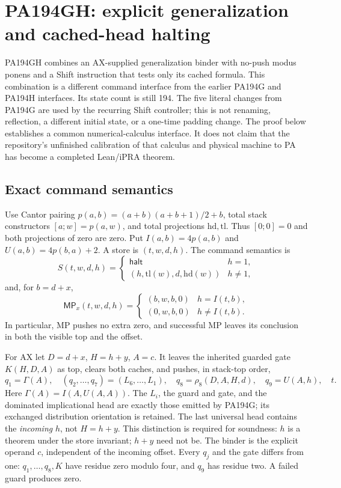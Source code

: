 \section{PA194GH: explicit generalization and cached-head halting}
\label{sec:gh}

PA194GH combines an AX-supplied generalization binder with no-push modus
ponens and a Shift instruction that tests only its cached formula.
This combination is a different command interface from the earlier PA194G
and PA194H interfaces. Its state count is still 194. The five literal
changes from PA194G are used by the recurring Shift controller; this is not
renaming, reflection, a different initial state, or a one-time padding change.
The proof below establishes a common numerical-calculus interface. It does
not claim that the repository's unfinished calibration of that calculus
and physical machine to PA has become a completed Lean/iPRA theorem.

\subsection{Exact command semantics}

Use Cantor pairing $p(a,b)=(a+b)(a+b+1)/2+b$, total stack constructors
$[a;w]=p(a,w)$, and total projections $\mathrm{hd},\mathrm{tl}$.
Thus $[0;0]=0$ and both projections of zero are zero. Put
$I(a,b)=4p(a,b)$ and $U(a,b)=4p(b,a)+2$. A store is $(t,w,d,h)$.
The command semantics is
\[
 S(t,w,d,h)=\begin{cases}\mathsf{halt}&h=1,\\
 (h,\mathrm{tl}(w),d,\mathrm{hd}(w))&h\ne1,
 \end{cases}
\]
and, for $b=d+x$,
\[
 \mathsf{MP}_{x}(t,w,d,h)=\begin{cases}(b,w,b,0)&h=I(t,b),\\
 (0,w,b,0)&h\ne I(t,b).
 \end{cases}
\]
In particular, MP pushes no extra zero, and successful MP leaves its
conclusion in both the visible top and the offset.

For AX let $D=d+x$, $H=h+y$, $A=c$. It leaves the inherited guarded gate
$K(H,D,A)$ as top, clears both caches, and pushes, in stack-top order,
\[
 q_1=\Gamma(A),\quad (q_2,\ldots,q_7)=(L_6,\ldots,L_1),\quad
 q_8=\rho_8(D,A,H,d),\quad q_9=U(A,h),\quad t.
\]
Here $\Gamma(A)=I(A,U(A,A))$. The $L_i$, the guard and gate, and the
dominated implicational head are exactly those emitted by PA194G; its
exchanged distribution orientation is retained. The last universal head
contains the \emph{incoming} $h$, not $H=h+y$. This distinction is required
for soundness: $h$ is a theorem under the store invariant; $h+y$ need not be.
The binder is the explicit operand $c$, independent of the incoming offset.
Every $q_j$ and the gate differs from one: $q_1,\ldots,q_8,K$ have residue
zero modulo four, and $q_9$ has residue two. A failed guard produces zero.

